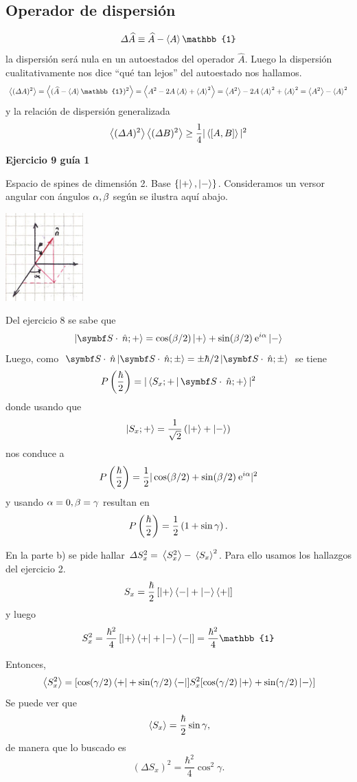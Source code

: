 \documentclass[10pt,oneside]{CBFT_book}
\begin{document}

\subsection{Operador de dispersión}

\[
	\Delta \widehat{A} \equiv \widehat{A} - \Braket{A}\mathbb{1}
\]
la dispersión será nula en un autoestados del operador $\widehat{A}$. Luego la dispersión cualitativamente nos dice 
``qué tan lejos'' del autoestado nos hallamos.
\[
	\Braket{(\Delta A)^2} = \Braket{(\widehat{A} - \Braket{A}\mathbb{1})^2} =
	\Braket{ A^2 - 2A\Braket{A} + \Braket{A}^2 } = \Braket{A^2} - 2A\Braket{A}^2 + \Braket{A}^2 =
	\Braket{A^2} - \Braket{A}^2
\]
y la relación de dispersión generalizada
\[
	\Braket{(\Delta A)^2} \Braket{(\Delta B)^2} \geq \frac{1}{4}|\Braket{[ A,B ]}|^2
\]

\begin{ejemplo}{\bf Ejercicio 9 guía 1}

Espacio de spines de dimensión 2. Base $\{ \Ket{+}, \Ket{-} \}$.
Consideramos un versor angular con ángulos $\alpha, \beta$ según se ilustra aquí abajo.

\includegraphics[width=0.225\textwidth]{images/fig_ft2_ejercicio91.jpg}

Del ejercicio 8 se sabe que
\[
	\Ket{\vb S\cdot\nver; +} = \cos(\b/2) \Ket{+} + \sin(\b/2) \euler^{i\a} \Ket{-}
\]
Luego, como $ \vb S\cdot\nver \Ket{\vb S\cdot\nver; \pm} = \pm \hbar/2 \Ket{\vb S\cdot\nver; \pm } $ 
se tiene
\[
	P\Frac{\hbar}{2} = |\Braket{S_x;+| \vb S\cdot\nver ; +}|^2
\]
donde usando que 
\[
	\Ket{S_x;+} = \frac{1}{\sqrt{2}} \left( \Ket{+} + \Ket{-} \right)
\]
nos conduce a
\[
	P\left( \frac{ \hbar }{ 2 } \right) = \frac{1}{2} | \cos(\beta/2) + \sin(\beta/2) \:\mathrm{e}^{i\alpha} |^2
\] 
y usando $\alpha=0, \beta=\gamma $ resultan en
\[
	P\left( \frac{ \hbar }{ 2 } \right) = \frac{1}{2} \left( 1 + \sin\gamma \right).
\]

En la parte b) se pide hallar $\Delta S_x^2 = \:\left\langle S_x^2 \right\rangle- \:\left\langle S_x \right\rangle^2 $. Para ello
usamos los hallazgos del ejercicio 2.
\[
	S_x = \frac{\hbar}{2} \left[ \Ket{+}\Bra{-} + \Ket{-}\Bra{+} \right]
\] 
y luego
\[
	S_x^2 = \frac{\hbar^2}{4}\left[ \KB{+}{+} + \KB{-}{-} \right] = 
	\frac{\hbar^2}{4}\mathbb{1}
\]

Entonces,
\[
	\:\left\langle S_x^2 \right\rangle = [ \cos(\gamma/2) \Bra{+} + \sin(\gamma/2) \Bra{-} ] S_x^2
	[ \cos(\gamma/2) \Ket{+} + \sin(\gamma/2) \Ket{-} ]
\]
Se puede ver que
\[
	\:\left\langle S_x \right\rangle = \frac{\hbar}{2} \sin\gamma,
\]
de manera que lo buscado es
\[
	(\Delta S_x)^2 = \frac{\hbar^2}{4} \cos^2\gamma.
\]
 
 
\end{ejemplo}
\end{document}
